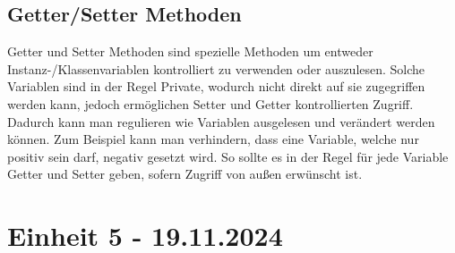 \documentclass{article}
\begin{document}
	\subsection{Getter/Setter Methoden}
	Getter und Setter Methoden sind spezielle Methoden um entweder Instanz-/Klassenvariablen kontrolliert zu verwenden oder auszulesen. Solche Variablen sind in der Regel Private, wodurch nicht direkt auf sie zugegriffen werden kann, jedoch ermöglichen Setter und Getter kontrollierten Zugriff. Dadurch kann man regulieren wie Variablen ausgelesen und verändert werden können.
	Zum Beispiel kann man verhindern, dass eine Variable, welche nur positiv sein darf, negativ gesetzt wird. So sollte es in der Regel für jede Variable Getter und Setter geben, sofern Zugriff von außen erwünscht ist.
	\section{Einheit 5 - 19.11.2024}
\end{document}
